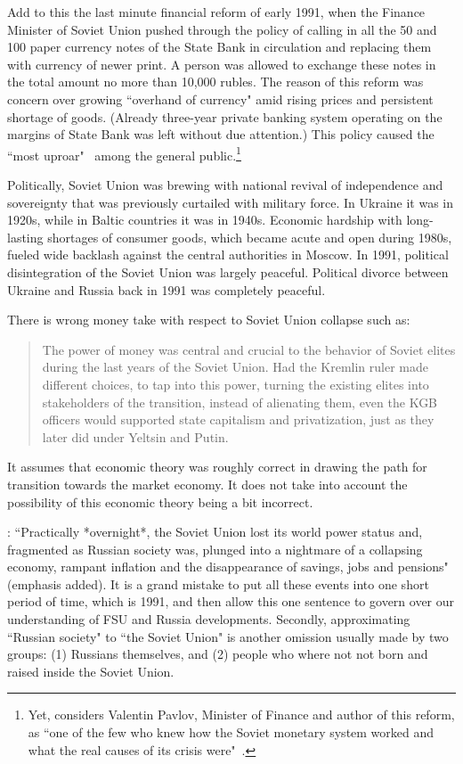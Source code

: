 Add to this the last minute financial reform of early 1991, when the
Finance Minister of Soviet Union pushed through the policy of calling in
all the 50 and 100 paper currency notes of the State Bank in circulation
and replacing them with currency of newer print. A person was allowed to
exchange these notes in the total amount no more than 10,000 rubles. The
reason of this reform was concern over growing ``overhand of currency"
amid rising prices and persistent shortage of goods. (Already three-year
private banking system operating on the margins of State Bank was left
without due attention.) This policy caused the ``most uproar"~\citep[p.~189]{zubok2021} among the general public.\footnote{Yet, \citeauthor{zubok2021} considers Valentin Pavlov, Minister of Finance and author of this reform, as ``one of the few who knew how the Soviet monetary system worked and what the real causes of its crisis were"~\citep[p.~175]{zubok2021}.}

Politically, Soviet Union was brewing with national revival of
independence and sovereignty that was previously curtailed with military
force. In Ukraine it was in 1920s, while in Baltic countries it was in
1940s. Economic hardship with long-lasting shortages of consumer goods,
which became acute and open during 1980s, fueled wide backlash against
the central authorities in Moscow. In 1991, political disintegration of
the Soviet Union was largely peaceful. Political divorce between Ukraine
and Russia back in 1991 was completely peaceful.

There is wrong money take with respect to Soviet Union collapse such as:

\begin{quote}
 The power of money was central and crucial to the behavior of Soviet
 elites during the last years of the Soviet Union. Had the Kremlin
 ruler made different choices, to tap into this power, turning the
 existing elites into stakeholders of the transition, instead of
 alienating them, even the KGB officers would supported state
 capitalism and privatization, just as they later did under Yeltsin and
 Putin.~\citep[p.~437]{zubok2021}
\end{quote}

It assumes that economic theory was roughly correct in drawing the path
for transition towards the market economy. It does not take into account
the possibility of this economic theory being a bit incorrect.

\cite{dibb2006}: ``Practically *overnight*, the Soviet Union lost its world
power status and, fragmented as Russian society was, plunged into a
nightmare of a collapsing economy, rampant inflation and the
disappearance of savings, jobs and pensions" (emphasis added). It is a
grand mistake to put all these events into one short period of time,
which is 1991, and then allow this one sentence to govern over our
understanding of FSU and Russia developments. Secondly, approximating
``Russian society" to ``the Soviet Union" is another omission usually made
by two groups: (1) Russians themselves, and (2) people who where not not
born and raised inside the Soviet Union.

